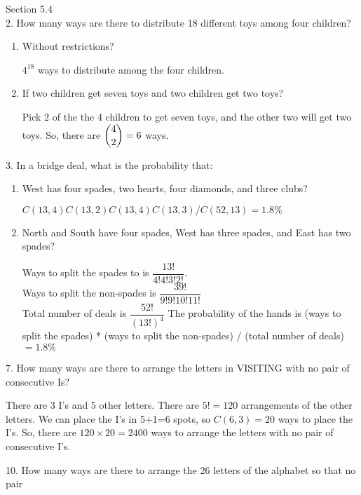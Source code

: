 \documentclass[12pt]{article}
\begin{document}
Section 5.4 \\
2. How many ways are there to distribute 18 different toys among four 
children?
\begin{enumerate}[label=(\alph*)]
    \item Without restrictions?
    \begin{solution}
        $4^{18}$ ways to distribute among the four children. 
    \end{solution}
    \item If two children get seven toys and two children get two toys?
    \begin{solution}
        Pick 2 of the the 4 children to get seven toys, and the other 
        two will get two toys. 
        So, there are $\dbinom{4}{2}=6$ ways.  
    \end{solution}
\end{enumerate}
3. In a bridge deal, what is the probability that:
\begin{enumerate}[label=(\alph*)]
    \item West has four spades, two hearts, four diamonds, and three clubs?
    \begin{solution}
        $C(13, 4)
        C(13, 2)
        C(13, 4)
        C(13, 3)/C(52, 13) = 1.8\%$
    \end{solution}
    \item North and South have four spades, West has three spades, and 
    East has two spades?
    \begin{solution}
        Ways to split the spades to is $\dfrac{13!}{4!4!3!2!}$. \\
        Ways to split the non-spades is $\dfrac{39!}{9!9!10!11!}$ \\
        Total number of deals is $\dfrac{52!}{(13!)^4}$
        The probability of the hands is (ways to split the spades) * (ways
        to split the non-spades) / (total number of deals) $=1.8\%$
    \end{solution}
\end{enumerate}
7. How many ways are there to arrange the letters in VISITING with no pair of
consecutive Is?
\begin{solution}
    There are 3 I's and 5 other letters. There are $5!=120$ arrangements of the
    other letters. We can place the I's in 5+1=6 spots, so $C(6, 3)=20$ 
    ways to place the I's. 
    So, there are $120\times20=2400$ ways to arrange the letters with
    no pair of consecutive I's. 
\end{solution}
10. How many ways are there to arrange the 26 letters of the alphabet so that no pair
\end{document}
